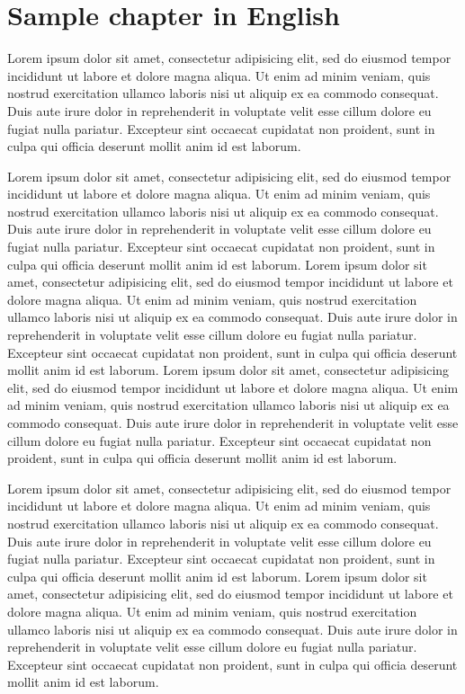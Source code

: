 
\chapter{Sample chapter in English}

Lorem ipsum dolor sit amet, consectetur adipisicing elit, sed do eiusmod
tempor incididunt ut labore et dolore magna aliqua. Ut enim ad minim
veniam, quis nostrud exercitation ullamco laboris nisi ut aliquip ex ea
commodo consequat. Duis aute irure dolor in reprehenderit in voluptate
velit esse cillum dolore eu fugiat nulla pariatur. Excepteur sint
occaecat cupidatat non proident, sunt in culpa qui officia deserunt
mollit anim id est laborum.

Lorem ipsum dolor sit amet, consectetur adipisicing elit, sed do eiusmod
tempor incididunt ut labore et dolore magna aliqua. Ut enim ad minim
veniam, quis nostrud exercitation ullamco laboris nisi ut aliquip ex ea
commodo consequat. Duis aute irure dolor in reprehenderit in voluptate
velit esse cillum dolore eu fugiat nulla pariatur. Excepteur sint
occaecat cupidatat non proident, sunt in culpa qui officia deserunt
mollit anim id est laborum. Lorem ipsum dolor sit amet, consectetur
adipisicing elit, sed do eiusmod tempor incididunt ut labore et dolore
magna aliqua. Ut enim ad minim veniam, quis nostrud exercitation ullamco
laboris nisi ut aliquip ex ea commodo consequat. Duis aute irure dolor
in reprehenderit in voluptate velit esse cillum dolore eu fugiat nulla
pariatur. Excepteur sint occaecat cupidatat non proident, sunt in culpa
qui officia deserunt mollit anim id est laborum.
Lorem ipsum dolor sit amet, consectetur adipisicing elit, sed do eiusmod
tempor incididunt ut labore et dolore magna aliqua. Ut enim ad minim
veniam, quis nostrud exercitation ullamco laboris nisi ut aliquip ex ea
commodo consequat. Duis aute irure dolor in reprehenderit in voluptate
velit esse cillum dolore eu fugiat nulla pariatur. Excepteur sint
occaecat cupidatat non proident, sunt in culpa qui officia deserunt
mollit anim id est laborum.

Lorem ipsum dolor sit amet, consectetur adipisicing elit, sed do eiusmod
tempor incididunt ut labore et dolore magna aliqua. Ut enim ad minim
veniam, quis nostrud exercitation ullamco laboris nisi ut aliquip ex ea
commodo consequat. Duis aute irure dolor in reprehenderit in voluptate
velit esse cillum dolore eu fugiat nulla pariatur. Excepteur sint
occaecat cupidatat non proident, sunt in culpa qui officia deserunt
mollit anim id est laborum.
Lorem ipsum dolor sit amet, consectetur adipisicing elit, sed do eiusmod
tempor incididunt ut labore et dolore magna aliqua. Ut enim ad minim
veniam, quis nostrud exercitation ullamco laboris nisi ut aliquip ex ea
commodo consequat. Duis aute irure dolor in reprehenderit in voluptate
velit esse cillum dolore eu fugiat nulla pariatur. Excepteur sint
occaecat cupidatat non proident, sunt in culpa qui officia deserunt
mollit anim id est laborum.


